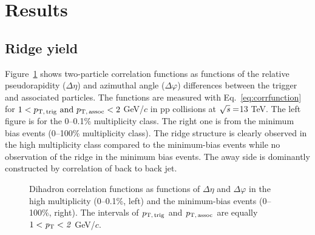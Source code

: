 
\section {Results}
\label{sec:results}

\subsection{Ridge yield}

Figure~\ref{fig:PlotCorrMBHMT} shows two-particle correlation functions as functions of the relative pseudorapidity ($\Delta \eta$) and azimuthal angle ($\Delta \varphi$) differences between the trigger and associated particles. The functions are measured with Eq.~\ref{eq:corrfunction} for $1 < p_\mathrm{T,\,trig}~\mathrm{and}~p_\mathrm{T,\,assoc} < 2$ GeV/$c$ in pp collisions at $\sqrt{\it{s}} = $\unit{13} {\rm{}TeV}. The left figure is for the 0--0.1\% multiplicity class. The right one is from the minimum bias events (0--100\% multiplicity class). The ridge structure is clearly observed in the high multiplicity class compared to the minimum-bias events while no observation of the ridge in the minimum bias events. The away side is dominantly constructed by correlation of back to back jet.

\begin{figure}[h!]
	\centering
	\caption{ Dihadron correlation functions as functions of $\Delta\eta$ and $\Delta\varphi$ in the high multiplicity (0--0.1\%, left) and the minimum-bias events (0--100\%, right). The intervals of $p_\mathrm{T,\,trig}$ and $p_\mathrm{T,\,assoc}$ are equally $1 < \it{p}_{\rm{T}} < 2$ GeV/$c$. }
	\label{fig:PlotCorrMBHMT}
\end{figure}


